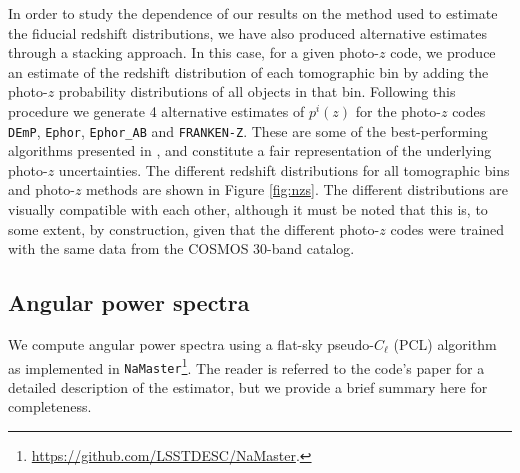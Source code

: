 \documentclass[a4paper,11pt]{article}
\begin{document}
    In order to study the dependence of our results on the method used to estimate the fiducial redshift distributions, we have also produced alternative estimates through a stacking approach. In this case, for a given photo-$z$ code, we produce an estimate of the redshift distribution of each tomographic bin by adding the photo-$z$ probability distributions of all objects in that bin. Following this procedure we generate 4 alternative estimates of $p^i(z)$ for the photo-$z$ codes {\tt DEmP}, {\tt Ephor}, {\tt Ephor\_AB} and {\tt FRANKEN-Z}. These are some of the best-performing algorithms presented in \cite{2018PASJ...70S...9T}, and constitute a fair representation of the underlying photo-$z$ uncertainties. The different redshift distributions for all tomographic bins and photo-$z$ methods are shown in Figure \ref{fig:nzs}. The different distributions are visually compatible with each other, although it must be noted that this is, to some extent, by construction, given that the different photo-$z$ codes were trained with the same data from the COSMOS 30-band catalog.

  \subsection{Angular power spectra}\label{ssec:methods.cell}
    We compute angular power spectra using a flat-sky pseudo-$C_\ell$ (PCL) algorithm \citep{2002ApJ...567....2H} as implemented in {\tt NaMaster}\footnote{\url{https://github.com/LSSTDESC/NaMaster}.}. The reader is referred to the code's paper \cite{2019MNRAS.484.4127A} for a detailed description of the estimator, but we provide a brief summary here for completeness.
    
\end{document}

